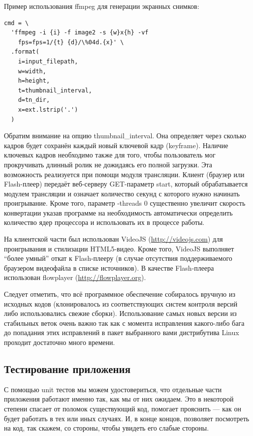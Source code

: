 \FloatBarrier

Пример использования ffmpeg для генерации экранных снимков:
\begin{verbatim}
cmd = \
  'ffmpeg -i {i} -f image2 -s {w}x{h} -vf
    fps=fps=1/{t} {d}/\%04d.{x}' \
  .format(
    i=input_filepath,
    w=width,
    h=height,
    t=thumbnail_interval,
    d=tn_dir,
    x=ext.lstrip('.')
  )
\end{verbatim}

Обратим внимание на опцию thumbnail\_interval. Она определяет через сколько кадров будет сохранён каждый новый
ключевой кадр (keyframe). Наличие ключевых кадров необходимо также для того, чтобы пользователь мог прокручивать
длинный ролик не дожидаясь его полной загрузки. Эта возможность реализуется при помощи модуля трансляции.
Клиент (браузер или Flash-плеер) передаёт веб-серверу GET-параметр start, который обрабатывается модулем трансляции
и означает количество секунд с которого нужно начинать проигрывание. Кроме того, параметр -threads 0 существенно
увеличит скорость конвертации указав программе на необходимость автоматически определить количество ядер
процессора и использовать их в процессе работы.

На клиентской части был использован VideoJS (\url{http://videojs.com}) для проигрывания и стилизации HTML5-видео.
Кроме того, VideoJS выполняет “более умный” откат к Flash-плееру (в случае отсутствия поддерживаемого браузером видеофайла
в списке источников). В качестве Flash-плеера использован flowplayer (\url{http://flowplayer.org}).

Следует отметить, что всё программное обеспечение собиралось вручную из исходных кодов (клонировалось из соответствующих
систем контроля версий либо использовались свежие сборки). Использование самых новых версии из стабильных веток очень важно
так как с момента исправления какого-либо бага до попадания этих исправлений в пакет выбранного вами дистрибутива Linux
проходит достаточно много времени.

\subsection{Тестирование приложения}

С помощью unit тестов мы можем удостовериться, что отдельные части приложения работают
именно так, как мы от них ожидаем. Это в некоторой степени спасает от поломок существующий
код, помогает прояснить — как он будет работать в тех или иных случаях. И, в конце концов,
позволяет посмотреть на код, так скажем, со стороны, чтобы увидеть его слабые стороны.

